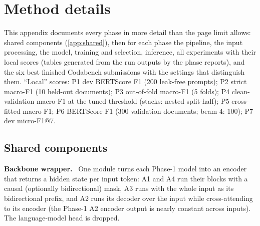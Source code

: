 \newcommand{\pipe}[1]{\begin{tikzpicture}[node distance=1.9mm,
    pb/.style={draw=black!55,rounded corners=2pt,fill=blue!5,align=center,font=\scriptsize,
               minimum height=9mm,text width=18.6mm,inner sep=2pt},
    ar/.style={-{Stealth[length=1.4mm]},black!55}]
  \foreach \t [count=\i] in {#1} {
    \ifnum\i=1 \node[pb] (n\i) {\t};
    \else \pgfmathtruncatemacro\j{\i-1}\node[pb,right=of n\j] (n\i) {\t}; \draw[ar] (n\j)--(n\i); \fi}
\end{tikzpicture}}
\makeatletter\newcommand{\tabinput}[1]{\@@input #1 }\makeatother %
\newcommand{\step}[1]{\par\smallskip\noindent\textbf{#1.}\ }
\newenvironment{topsix}{\par\smallskip\noindent\scriptsize
  \tabularx{\linewidth}{@{}c>{\raggedright\arraybackslash}p{3.45cm}rr>{\raggedright\arraybackslash}X@{}}\toprule
  \# & Submission & Codabench & Local & Method (key settings)\\\midrule}{\bottomrule\endtabularx\par\medskip}

\section{Method details}\label{app:top6}
This appendix documents every phase in more detail than the page limit allows: shared components
(\autoref{app:shared}), then for each phase the pipeline, the input processing, the model, training and
selection, inference, all experiments with their local scores (tables generated from the run outputs by the
phase reports), and the six best finished Codabench submissions with the settings that distinguish them.
``Local'' scores: P1 dev BERTScore F1 (200 leak-free prompts); P2 strict macro-F1 (10 held-out documents); P3
out-of-fold macro-F1 (5 folds); P4 clean-validation macro-F1 at the tuned threshold (stacks: nested split-half);
P5 cross-fitted macro-F1; P6 BERTScore F1 (300 validation documents; beam 4: 100); P7 dev micro-F1@7.

\subsection{Shared components}\label{app:shared}
\step{Backbone wrapper} One module turns each Phase-1 model into an encoder that returns a hidden state per
input token: A1 and A4 run their blocks with a causal (optionally bidirectional) mask, A3 runs with the whole
input as its bidirectional prefix, and A2 runs its decoder over the input while cross-attending to its encoder
(the Phase-1 A2 encoder output is nearly constant across inputs).  The language-model head is dropped.

